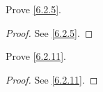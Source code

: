 \exercisesection

\begin{exercise}\label{ex 6.2.1}
  Prove \cref{6.2.5}.
\end{exercise}

\begin{proof}
  See \cref{6.2.5}.
\end{proof}

\begin{exercise}\label{ex 6.2.2}
  Prove \cref{6.2.11}.
\end{exercise}

\begin{proof}
  See \cref{6.2.11}.
\end{proof}